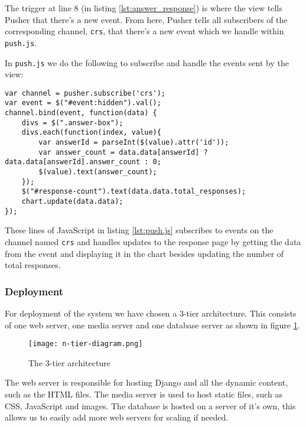 The trigger at line 8 (in listing \ref{lst:answer_response}) is where the view tells Pusher that there's a new event. From here, Pusher tells all subscribers of the corresponding channel, \texttt{crs}, that there's a new event which we handle within \texttt{push.js}.

In \texttt{push.js} we do the following to subscribe and handle the events sent by the view:

\begin{lstlisting}[caption=Selected parts of push.js, label=lst:push.js]
var channel = pusher.subscribe('crs');
var event = $("#event:hidden").val();
channel.bind(event, function(data) {
    divs = $(".answer-box");
    divs.each(function(index, value){
        var answerId = parseInt($(value).attr('id'));
        var answer_count = data.data[answerId] ? data.data[answerId].answer_count : 0;
        $(value).text(answer_count);
    });
    $("#response-count").text(data.data.total_responses);
    chart.update(data.data);
});
\end{lstlisting}
These lines of JavaScript in listing \ref{lst:push.js} subscribes to events on the channel named \texttt{crs} and handles updates to the response page by getting the data from the event and displaying it in the chart besides updating the number of total responses.

\subsubsection*{Deployment}

For deployment of the system we have chosen a 3-tier architecture. This consists of one web server, one media server and one database server as shown in figure \ref{fig:3-tier}. 

\begin{figure}[H]
\capstart
	\centering
		\texttt{[image: n-tier-diagram.png]}
	\caption[]{The 3-tier architecture \label{fig:3-tier}}
\end{figure}

The web server is responsible for hosting Django and all the dynamic content, such as the HTML files. The media server is used to host static files, such as CSS, JavaScript and images. The database is hosted on a server of it's own, this allows us to easily add more web servers for scaling if needed.

